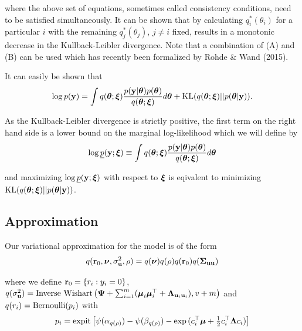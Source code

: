 \documentclass{amsart}[12pt]
\begin{document}
\noindent where the above set of equations, sometimes called consistency conditions, need to be 
satisfied simultaneously. It can be shown that by calculating $q_i^*(\theta_i)$ for a particular
$i$ with the remaining $q_j^*(\theta_j)$, $j\ne i$ fixed, results in a monotonic decrease in the 
Kullback-Leibler divergence. Note that a combination of (A) and (B) can be used which has recently
been formalized by Rohde \& Wand (2015). 

\noindent It can easily be shown that
$$
\displaystyle \log p({\bf y}) = \int q({\boldsymbol \theta};{\boldsymbol \xi})\frac{p({\bf y}|{\boldsymbol \theta})p({\boldsymbol \theta})}{q({\boldsymbol \theta};{\boldsymbol \xi})} d{\boldsymbol \theta} + \text{KL}(q({\boldsymbol \theta};{\boldsymbol \xi})||p({\boldsymbol \theta}|{\bf y})).
$$

\noindent As the Kullback-Leibler divergence is strictly positive, the first term on the right hand side
is a lower bound on the marginal log-likelihood which we will define by
$$
\displaystyle \log \underline{p}({\bf y};{\boldsymbol \xi}) \equiv \int q({\boldsymbol \theta};{\boldsymbol \xi})\frac{p({\bf y}|{\boldsymbol \theta})p({\boldsymbol \theta})}{q({\boldsymbol \theta};{\boldsymbol \xi})} d{\boldsymbol \theta}
$$

\noindent and maximizing $\log \underline{p}({\bf y};{\boldsymbol \xi})$ with respect to ${\boldsymbol \xi}$ is eqivalent to minimizing
$\text{KL}(q({\boldsymbol \theta};{\boldsymbol \xi})||p({\boldsymbol \theta}|{\bf y}))$.


\subsection{Approximation}

Our variational approximation for the model is of the form 
$$
q({\bf r}_0, {\boldsymbol \nu}, \sigma_{{\bf u}}^2, \rho) = q({\boldsymbol \nu})q(\rho) q({\bf r}_0)q({\boldsymbol \Sigma}_{{\bf u} {\bf u}})  \\
$$

\noindent 
where we define ${\bf r}_0 = \{ r_i : y_i = 0 \}$,
$q(\sigma_{{\bf u}}^2) = \mbox{Inverse Wishart}\left({\boldsymbol \Psi} + \sum_{i=1}^m ({\boldsymbol \mu}_i {\boldsymbol \mu}_i^\top + {\boldsymbol \Lambda}_{{\bf u}_i {\bf u}_i}), v + m \right)$ \mbox{and } $q(r_i) = \text{Bernoulli} (p_i)$ with
$$
p_i = \text{expit} \left[ \psi{(\alpha_{q(\rho)})} - \psi{(\beta_{q(\rho)})} - \exp{(c_i^\top{\boldsymbol\mu}+  \tfrac{1}{2} c_i^\top {\boldsymbol\Lambda}c_i)} \right]
$$
\end{document}
